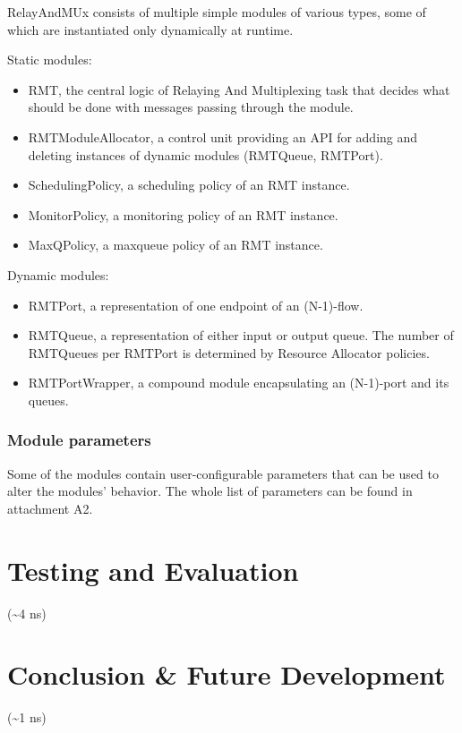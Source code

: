             RelayAndMUx consists of multiple simple modules of various types, some of which are instantiated only dynamically at runtime.

            Static modules:
            \begin{itemize}
                \item RMT, the central logic of Relaying And Multiplexing task that decides what should be done with messages passing through the module.
                \item RMTModuleAllocator, a control unit providing an API for adding and deleting instances of dynamic modules (RMTQueue, RMTPort).
                \item SchedulingPolicy, a scheduling policy of an RMT instance.
                \item MonitorPolicy, a monitoring policy of an RMT instance.
                \item MaxQPolicy, a maxqueue policy of an RMT instance.
            \end{itemize}

            Dynamic modules:
            \begin{itemize}
                \item RMTPort, a representation of one endpoint of an (N-1)-flow.
                \item RMTQueue, a representation of either input or output queue. The number of RMTQueues per RMTPort is determined by Resource Allocator policies.
                \item RMTPortWrapper, a compound module encapsulating an (N-1)-port and its queues.
            \end{itemize}

        \subsection{Module parameters}
            Some of the modules contain user-configurable parameters that can be used to alter the modules' behavior. The whole list of parameters can be found in attachment A2.




\chapter{Testing and Evaluation}
    (\textasciitilde4 ns)

\chapter{Conclusion \& Future Development}
    (\textasciitilde1 ns)
